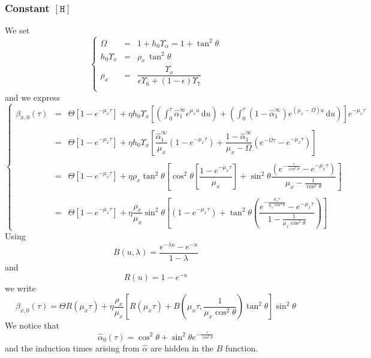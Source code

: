 \documentclass[aps,onecolumn,10pt]{revtex4}
\newcommand{\mychem}[1]{\mathtt{#1}}
\newcommand{\myconc}[1]{\left\lbrack{#1}\right\rbrack}
\newcommand{\spproton}{\mychem{H}}
\newcommand{\proton}{\myconc{\spproton}}
\begin{document}
\subsubsection{Constant $\proton$}
We set
\begin{equation}
\left\lbrace
\begin{array}{rcl}
	\Omega & = & 1 + h_0 \Upsilon_\alpha = 1 + \tan^2 \theta\\
	h_0 \Upsilon_x & = & \rho_x \, \tan^2\theta\\
	\rho_x & = & \dfrac{\Upsilon_x}{\epsilon\Upsilon_6+(1-\epsilon)\Upsilon_7}\\
\end{array}
\right.
\end{equation}
and we express
\begin{equation}
\left\lbrace
\begin{array}{rcl}
	\beta_{x,0}(\tau) & = & \displaystyle \Theta \left[ 1-e^{-\mu_x \tau}\right] + \eta h_0 \Upsilon_x
	\left[ 
	\left(
	\int_0^\tau 
	\hat\alpha_1^\infty e^{\mu_x u}
	\, \mathrm{d} u
	\right)
	+
	\left(
	\int_0^\tau \left(1-\hat\alpha_1^\infty\right) e^{(\mu_x-\Omega) u} \, \mathrm{d} u
	\right)
	\right] e^{-\mu_x \tau} \\
	\\
	& = & \displaystyle \Theta \left[ 1-e^{-\mu_x \tau}\right] + \eta h_0 \Upsilon_x \left[
	\dfrac{\hat\alpha_1^\infty}{\mu_x}\left(1-e^{-\mu_x \tau}\right)
	+\dfrac{1-\hat\alpha_1^\infty}{\mu_x-\Omega}\left(e^{-\Omega\tau}-e^{-\mu_x\tau}\right)
	\right]\\\\
	& = & \displaystyle \Theta \left[ 1-e^{-\mu_x \tau}\right] + \eta \rho_x \tan^2\theta \left[
	\cos^2\theta \left[\dfrac{1-e^{-\mu_x \tau}}{\mu_x}\right]
	+\sin^2\theta\dfrac{\left(e^{-\frac{\tau}{\cos^2\theta}}-e^{-\mu_x\tau}\right)}{\mu_x-\frac{1}{\cos^2\theta}}
	\right]\\
	\\
	& = & \displaystyle \Theta \left[ 1-e^{-\mu_x \tau}\right] + \eta \dfrac{\rho_x}{\mu_x} \sin^2\theta 
	\left[
	\left({1-e^{-\mu_x \tau}}\right) + \tan^2\theta
	\left(
	 \dfrac{e^{-\frac{\mu_x\tau}{\mu_x\cos^2\theta}}-e^{-\mu_x\tau}}{1-\frac{1}{\mu_x\cos^2\theta}}
	 \right)
	\right]
	\end{array}
\right.
\end{equation}
Using 
\begin{equation}
	B(u,\lambda) = \dfrac{e^{-\lambda u}-e^{-u}}{1-\lambda}
\end{equation}
and
\begin{equation}
	R(u) = 1-e^{-u}
\end{equation}
we write
\begin{equation}
		\beta_{x,0}(\tau) = \Theta R(\mu_x\tau) + \eta \dfrac{\rho_x}{\mu_x}  \left[ R(\mu_x\tau) +  B\left(\mu_x\tau,\frac{1}{\mu_x\cos^2\theta}\right)\tan^2\theta\right]\sin^2\theta
\end{equation}
We notice that
\begin{equation}
	\hat\alpha_0(\tau) = \cos^2\theta + \sin^2\theta e^{-\frac{\tau}{\cos^2\theta}}
\end{equation}
and the induction times arising from $\hat\alpha$ are hidden in the $B$ function.
\end{document}
